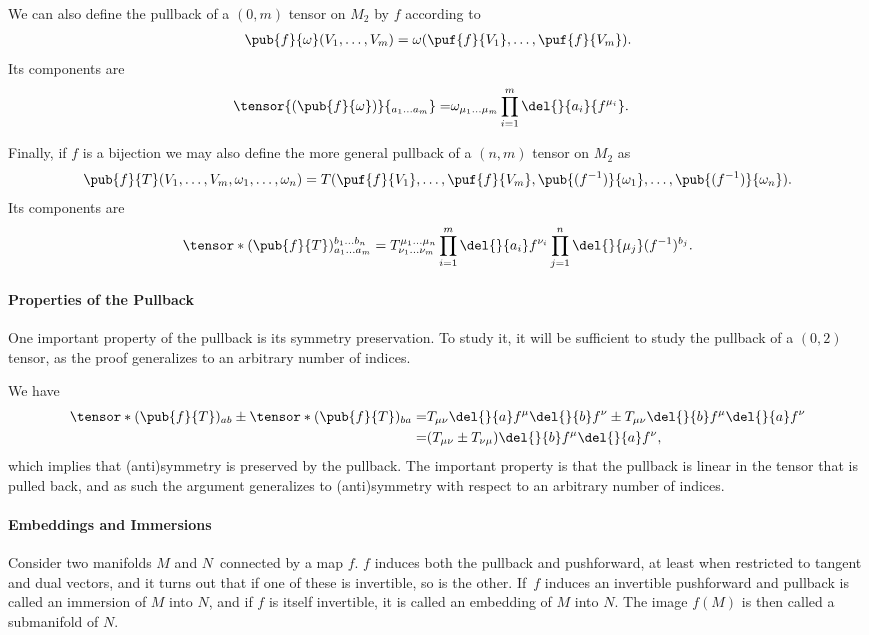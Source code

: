 We can also define the pullback of a $(0, m)$ tensor on $M_{2}$ by $f$ according to
\begin{align*}
	\pub{f}{\omega}(V_{1}, \dots, V_{m}) = \omega(\puf{f}{V_{1}}, \dots, \puf{f}{V_{m}}).
\end{align*}
Its components are
\begin{align*}
	\tensor{(\pub{f}{\omega})}{_{a_{1}\dots a_{m}}} =& \omega_{\mu_{1}\dots\mu_{m}}\prod\limits_{i = 1}^{m}\del{}{a_{i}}{f^{\mu_{i}}}.
\end{align*}

Finally, if $f$ is a bijection we may also define the more general pullback of a $(n, m)$ tensor on $M_{2}$ as
\begin{align*}
	\pub{f}{T}(V_{1}, \dots, V_{m}, \omega_{1}, \dots, \omega_{n}) = T(\puf{f}{V_{1}}, \dots, \puf{f}{V_{m}}, \pub{(f^{-1})}{\omega_{1}}, \dots, \pub{(f^{-1})}{\omega_{n}}).
\end{align*}
Its components are
\begin{align*}
	\tensor*{(\pub{f}{T})}{^{b_{1}\dots b_{n}}_{a_{1}\dots a_{m}}} = T^{\mu_{1}\dots \mu_{n}}_{\nu_{1}\dots\nu_{m}}\prod\limits_{i = 1}^{m}\del{}{a_{i}}f^{\nu_{i}}\prod\limits_{j = 1}^{n}\del{}{\mu_{j}}(f^{-1})^{b_{j}}.
\end{align*}

\paragraph{Properties of the Pullback}
One important property of the pullback is its symmetry preservation. To study it, it will be sufficient to study the pullback of a $(0, 2)$ tensor, as the proof generalizes to an arbitrary number of indices.

We have
\begin{align*}
	\tensor*{(\pub{f}{T})}{_{ab}} \pm \tensor*{(\pub{f}{T})}{_{ba}} =& T_{\mu\nu}\del{}{a}f^{\mu}\del{}{b}f^{\nu} \pm T_{\mu\nu}\del{}{b}f^{\mu}\del{}{a}f^{\nu} \\
	=& (T_{\mu\nu} \pm T_{\nu\mu})\del{}{b}f^{\mu}\del{}{a}f^{\nu},
\end{align*}
which implies that (anti)symmetry is preserved by the pullback. The important property is that the pullback is linear in the tensor that is pulled back, and as such the argument generalizes to (anti)symmetry with respect to an arbitrary number of indices.

\paragraph{Embeddings and Immersions}
Consider two manifolds $M$ and $N$ connected by a map $f$. $f$ induces both the pullback and pushforward, at least when restricted to tangent and dual vectors, and it turns out that if one of these is invertible, so is the other. If $f$ induces an invertible pushforward and pullback is called an immersion of $M$ into $N$, and if $f$ is itself invertible, it is called an embedding of $M$ into $N$. The image $f(M)$ is then called a submanifold of $N$.

